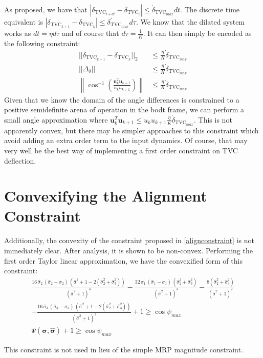 As proposed, we have that $|{\delta_{\text{TVC}_{t+dt}} - \delta_{\text{TVC}_{t}}}| \leq \dot{\delta}_{\text{TVC}_{max}}dt$. The discrete time equivalent is $|{\delta_{\text{TVC}_{k+1}} - \delta_{\text{TVC}_{k}}}| \leq \delta^\prime_{\text{TVC}_{max}}d\tau$. We know that the dilated system works as $dt = \eta d\tau$ and of course that $d\tau = \frac{1}{K}$. It can then simply be encoded as the following constraint:
%
\begin{align}
	||{\delta_{\text{TVC}_{k+1}} - \delta_{\text{TVC}_{k}}}||_2 &\leq \frac{\eta}{K}\dot{\delta}_{\text{TVC}_{max}} \\
	|| \Delta_\delta || & \leq \frac{\eta}{K}\dot{\delta}_{\text{TVC}_{max}}  \\ 
	\left \lVert \cos^{-1}\left (\frac{\mathbf{u}_k^T\mathbf{u}_{k+1}}{u_k u_{k+1}} \right) \right \rVert & \leq \frac{\eta}{K}\dot{\delta}_{\text{TVC}_{max}}
\end{align}
Given that we know the domain of the angle differences is constrained to a positive semidefinite arena of operation in the bodt frame, we can perform a small angle approximation where $\mathbf{u}_k^T\mathbf{u}_{k+1} \leq u_k u_{k+1}\frac{\eta}{K}\dot{\delta}_{\text{TVC}_{max}}$. This is not apparently convex, but there may be simpler approaches to this constraint which avoid adding an extra order term to the input dynamics. Of course, that may very well be the best way of implementing a first order constraint on TVC deflection.






\section{Convexifying the Alignment Constraint}
Additionally, the convexity of the constraint proposed in \ref{alignconstraint} is not immediately clear. After analysis, it is shown to be non-convex. Performing the first order Taylor linear approximation, we have the convexified form of this constraint:
%
\begin{align*}
    \frac{16\,\hat{\sigma}_2\,\left(\hat{\sigma}_2-\sigma_{2}\right)\,\left(\mathrm{\hat{\sigma}^2}+1 -2 (\hat{\sigma}_2^2 + \hat{\sigma}_3^2)\right)}{{\left(\mathrm{\hat{\sigma}^2}+1\right)}^3}-\frac{32\,\hat{\sigma}_1\,\left(\hat{\sigma}_1-\sigma_{1}\right)\,\left(\hat{\sigma}_2^2+ \hat{\sigma}_3^2\right)}{{\left(\mathrm{\hat{\sigma}^2}+1\right)}^3}
    -\frac{8(\hat{\sigma}_2^2+\hat{\sigma}_3^2)}{{\left(\mathrm{\hat{\sigma}^2}+1\right)}^2}
    \\ +\frac{16\,\hat{\sigma}_3\,\left(\hat{\sigma}_3-\sigma_{3}\right)\,\left(\mathrm{\hat{\sigma}^2}+1-2(\hat{\sigma}_2^2+\hat{\sigma}_3^2)\right)}{{\left(\mathrm{\hat{\sigma}^2}+1\right)}^3}+1 \geq \cos\psi_{max} \\
    \Psi (\boldsymbol{\sigma},\hat{\boldsymbol{\sigma}}) + 1 \geq \cos \psi_{max}
\end{align*}

This constraint is not used in lieu of the simple MRP magnitude constraint.










